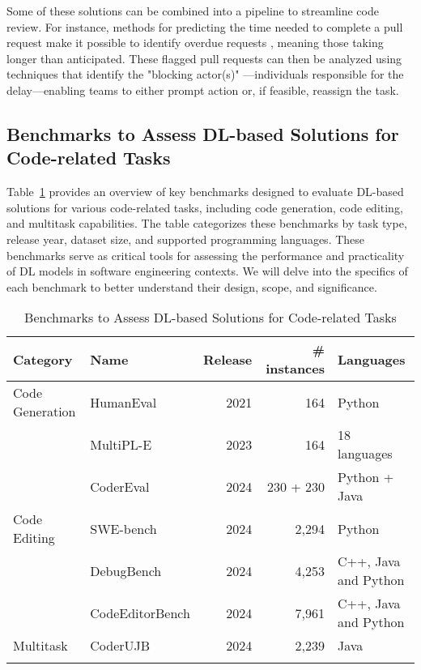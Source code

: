 Some of these solutions can be combined into a pipeline to streamline code
review. For instance, methods for predicting the time needed to complete a pull
request \cite{maddila:esefse2019,shan:esecfse2022} make it possible to identify
overdue requests \cite{shan:esecfse2022}, meaning those taking longer than
anticipated. These flagged pull requests can then be analyzed using techniques
that identify the "blocking actor(s)" \cite{shan:esecfse2022}—individuals
responsible for the delay—enabling teams to either prompt action or, if
feasible, reassign the task.

\subsection{Benchmarks to Assess DL-based Solutions for Code-related Tasks}

Table~\ref{tab:benchs} provides an overview of key benchmarks designed to
evaluate DL-based solutions for various code-related tasks, including code
generation, code editing, and multitask capabilities. The table categorizes
these benchmarks by task type, release year, dataset size, and supported
programming languages. These benchmarks serve as critical tools for assessing
the performance and practicality of DL models in software engineering contexts.
We will delve into the specifics of each benchmark to better understand their
design, scope, and significance.

\begin{table}[ht]
	\centering
	\begin{tabular}{llrrl}
		\toprule
		\textbf{Category}     &
		\textbf{Name}         &
		\textbf{Release}      &
		\textbf{\# instances} &
		\textbf{Languages}                                                                                              \\
		\midrule
		Code Generation       & HumanEval \cite{chen2021}                     & 2021 & 164       & Python               \\
		                      & MultiPL-E \cite{cassano2022}                  & 2023 & 164       & 18 languages         \\
		                      & CoderEval \cite{Zhang_2024}                   & 2024 & 230 + 230 & Python + Java        \\
		\arrayrulecolor{lightgray}\hline
		Code Editing          & SWE-bench \cite{jimenez2024swebench}          & 2024 & 2,294     & Python               \\
		                      & DebugBench \cite{tian2024debugbench}          & 2024 & 4,253     & C++, Java and Python \\
		                      & CodeEditorBench \cite{guo2024codeeditorbench} & 2024 & 7,961     & C++, Java and Python \\
		\arrayrulecolor{lightgray}\hline
		Multitask             & CoderUJB \cite{zeng2024coderujb}              & 2024 & 2,239     & Java                 \\
		\arrayrulecolor{black}\bottomrule
	\end{tabular}
	\caption{Benchmarks to Assess DL-based Solutions for Code-related Tasks}\label{tab:benchs}
\end{table}

